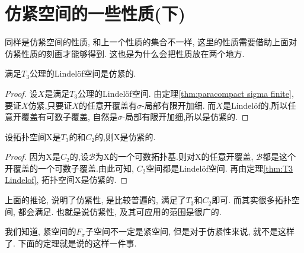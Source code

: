 \chapter{仿紧空间的一些性质(下)}
\label{chap04}

同样是仿紧空间的性质, 和上一个性质的集合不一样,
这里的性质需要借助上面对仿紧性质的刻画才能够得到.
这也是为什么会把性质放在两个地方.

\begin{thm} \label{thm:T3 Lindelof}
  满足$T_3$公理的Lindel\"{o}f空间是仿紧的.
\end{thm}
\begin{proof}
  设$X$是满足$T_3$公理的Lindel\"{o}f空间.
  由定理\ref{thm:paracompact sigma finite},
  要证$X$仿紧,只要证$X$的任意开覆盖有$\sigma$-局部有限开加细.
  而$X$是Lindel\"{o}f的,所以任意开覆盖有可数子覆盖,
  自然是$\sigma$-局部有限开加细,所以是仿紧的.
\end{proof}

\begin{corollary}
  设拓扑空间X是$T_3$的和$C_2$的,则X是仿紧的.
\end{corollary}
\begin{proof}
  因为X是$C_2$的,设$\mathscr{B}$为X的一个可数拓扑基.则对X的任意开覆盖,
  $\mathscr{B}$都是这个开覆盖的一个可数子覆盖.由此可知, $C_2$空间都是Lindel\"{o}f空间.
  再由定理\ref{thm:T3 Lindelof}, 拓扑空间X是仿紧的.
\end{proof}

上面的推论, 说明了仿紧性, 是比较普遍的, 满足了$T_3$和$C_2$即可.
而其实很多拓扑空间, 都会满足. 也就是说仿紧性, 及其可应用的范围是很广的.

我们知道, 紧空间的$F_\sigma$子空间不一定是紧空间, 但是对于仿紧性来说, 就不是这样了.
下面的定理就是说的这样一件事.

